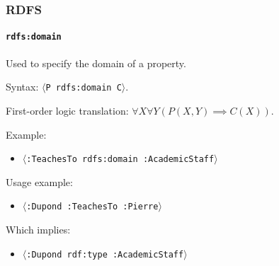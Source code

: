 \documentclass{beamer}
\newcommand{\triple}[1]{$\langle$\texttt{#1}$\rangle$}
\begin{document}
\begin{frame}
  \frametitle{RDFS}
  \framesubtitle{\texttt{rdfs:domain}}

  Used to specify the domain of a property.

  \pause

  \bigskip

  Syntax: \triple{P rdfs:domain C}.

  \pause

  \medskip

  First-order logic translation: $\forall X \forall Y (P(X, Y) \implies C(X))$.

  \pause

  \bigskip

  Example:

  \begin{itemize}
    \item \triple{:TeachesTo rdfs:domain :AcademicStaff}
  \end{itemize}

  \pause

  Usage example:

  \begin{itemize}
    \item \triple{:Dupond :TeachesTo :Pierre}
  \end{itemize}

  \pause

  Which implies:

  \begin{itemize}
    \item \triple{:Dupond rdf:type :AcademicStaff}
  \end{itemize}
\end{frame}
\end{document}
